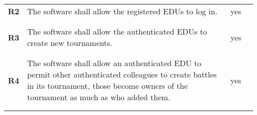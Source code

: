 \begin{longtable}[H]{l p{8cm} l p{2cm}}
    \textbf{R2}  & The software shall allow the registered EDUs to log in.                                                                                                                                                                                                                  & {\color{green}yes}   &                                                                                         \\
                 &                                                                                                                                                                                                                                                                          &                      &                                                                                         \\\hline & & & \\
    \textbf{R3}  & The software shall allow the authenticated EDUs to create new tournaments.                                                                                                                                                                                               & {\color{green}yes}   &                                                                                         \\
                 &                                                                                                                                                                                                                                                                          &                      &                                                                                         \\\hline & & & \\
    \textbf{R4}  & The software shall allow an authenticated EDU to permit other authenticated colleagues to create battles in its tournament, those become owners of the tournament as much as who added them.                                                                             & {\color{green}yes}   &                                                                                         \\
                 &                                                                                                                                                                                                                                                                          &                      &                                                                                         \\\hline & & & \\

\end{longtable}
